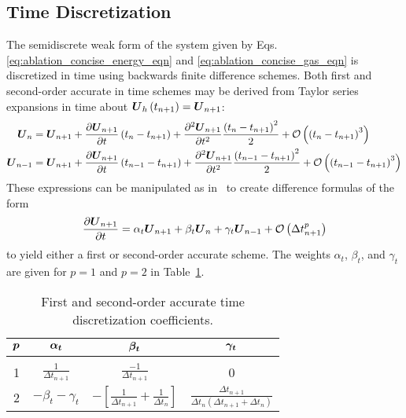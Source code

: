 \subsection{Time Discretization}
The semidiscrete weak form of the system given by Eqs. \ref{eq:ablation_concise_energy_eqn} and \ref{eq:ablation_concise_gas_eqn} is discretized in time using backwards finite difference schemes.  Both first and second-order accurate in time schemes may be derived from Taylor series expansions in time about ${\boldsymbol{U}}_h\left(t_{n+1}\right)={\boldsymbol{U}}_{n+1}$:
\begin{align}
  {\boldsymbol{U}}_n     = {\boldsymbol{U}}_{n+1} &+ {\frac{\partial{{\boldsymbol{U}}_{n+1}}}{\partial{t}}}\left(t_n-t_{n+1}\right) + {\frac{{\partial}^2{{\boldsymbol{U}}_{n+1}}}{\partial{t}^2}}\frac{\left(t_n-t_{n+1}\right)^2}{2} + \mathcal{O}\left(\left(t_n-t_{n+1}\right)^3\right) \nonumber \\
  {\boldsymbol{U}}_{n-1} = {\boldsymbol{U}}_{n+1} &+ {\frac{\partial{{\boldsymbol{U}}_{n+1}}}{\partial{t}}}\left(t_{n-1}-t_{n+1}\right) + {\frac{{\partial}^2{{\boldsymbol{U}}_{n+1}}}{\partial{t}^2}}\frac{\left(t_{n-1}-t_{n+1}\right)^2}{2} + \mathcal{O}\left(\left(t_{n-1}-t_{n+1}\right)^3\right) \nonumber
\end{align}
These expressions can be manipulated as in~\cite{benkirk_dissertation,fins_ijnmf} to create difference formulas of the form
\begin{equation}
  {\frac{\partial{{\boldsymbol{U}}_{n+1}}}{\partial{t}}} = \alpha_t {\boldsymbol{U}}_{n+1} + \beta_t {\boldsymbol{U}}_n + \gamma_t {\boldsymbol{U}}_{n-1} + \mathcal{O}\left(\Delta t_{n+1}^p\right)
  \label{eq:udot_thee_pt_backward}
\end{equation}
to yield either a first or second-order accurate scheme.  The weights $\alpha_t$, $\beta_t$, and $\gamma_t$ are given for $p=1$ and $p=2$ in Table~\ref{table:udot_weights}.
\begin{table}[hbtp]
  \begin{center}
    \caption{First and second-order accurate time discretization coefficients.\label{table:udot_weights}}
    \vspace{.2em}
    \begin{tabular}{c||ccc}
      ${\boldsymbol{p}}$ & ${\boldsymbol{\alpha_t}}$ & ${\boldsymbol{\beta_t}}$ & ${\boldsymbol{\gamma_t}}$ \\ \hline\hline
           &          &         & \\
       1  & $\frac{1}{\Delta t_{n+1}}$ & $\frac{-1}{\Delta t_{n+1}}$ & 0 \\
       2  & $-\beta_t - \gamma_t$ 
          & $-\left[\frac{1}{\Delta t_{n+1}} + \frac{1}{\Delta t_n}\right]$
          & $\frac{\Delta t_{n+1}}{\Delta t_n\left(\Delta t_{n+1} + \Delta t_n\right)}$ 
    \end{tabular}
  \end{center}
\end{table}

